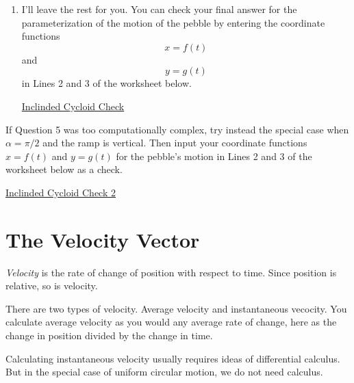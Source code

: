 \documentclass{ximera}
\begin{document}
\begin{question}
\begin{explanation}
\begin{enumerate}
\item I'll leave the rest for you. You can check your final answer for the parameterization of the motion of the pebble by entering the coordinate functions 
\[
  x = f(t)
\]
and 
\[
   y = g(t)
\]
in Lines 2 and 3 of the worksheet below.

\begin{onlineOnly}
    \begin{center}
\end{center}
\end{onlineOnly}

\href{https://www.desmos.com/calculator/fgklkuby4m}{Inclinded Cycloid Check}

\end{enumerate}
\end{explanation}
\end{question}

\begin{question} \label{Qer33rfr}
If Question 5 was too computationally complex, try instead the special case when $\alpha=\pi/2$ and the ramp is vertical. Then input your coordinate functions $x=f(t)$ and $y=g(t)$ for the pebble's motion in Lines 2 and 3 of the worksheet below as a check.

\begin{onlineOnly}
    \begin{center}
\end{center}
\end{onlineOnly}

\href{https://www.desmos.com/calculator/rumex1zblq}{Inclinded Cycloid Check 2}

\end{question}


\section{The Velocity Vector}
\emph{Velocity} is the rate of change of position with respect to time. Since position is relative, so is velocity. 

There are two types of velocity. Average velocity and instantaneous vecocity. You calculate average velocity as you would any average rate of change, here as the change in position divided by the change in time.

Calculating instantaneous velocity usually requires ideas of differential calculus. But in the special case of uniform circular motion, we do not need calculus.
\end{document}
